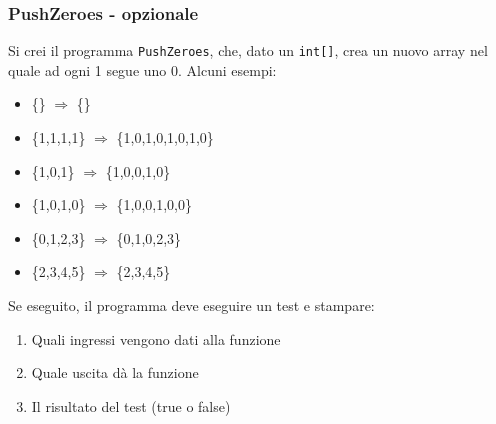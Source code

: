 \documentclass{beamer}
\begin{document}
\begin{frame}
\frametitle{PushZeroes - opzionale}
Si crei il programma \texttt{PushZeroes}, che, dato un \texttt{int[]}, crea un nuovo array nel quale ad ogni 1 segue uno 0. Alcuni esempi:
\begin{itemize}
 \item \{\} $\Rightarrow$ \{\}
 \item \{1,1,1,1\} $\Rightarrow$ \{1,0,1,0,1,0,1,0\}
 \item \{1,0,1\} $\Rightarrow$ \{1,0,0,1,0\}
 \item \{1,0,1,0\} $\Rightarrow$ \{1,0,0,1,0,0\}
 \item \{0,1,2,3\} $\Rightarrow$ \{0,1,0,2,3\}
 \item \{2,3,4,5\} $\Rightarrow$ \{2,3,4,5\}
\end{itemize}
Se eseguito, il programma deve eseguire un test e stampare:
\begin{enumerate}
 \item Quali ingressi vengono dati alla funzione
 \item Quale uscita dà la funzione
 \item Il risultato del test (true o false)
\end{enumerate}
\end{frame}
\end{document}
